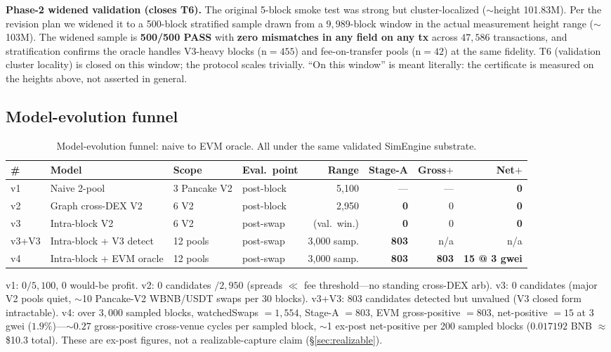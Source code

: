 \documentclass[11pt]{article}
\begin{document}
\noindent \textbf{Phase-2 widened validation (closes T6).} The original 5-block smoke
test was strong but cluster-localized ($\sim$height 101.83M). Per the revision plan we
widened it to a 500-block stratified sample drawn from a $9{,}989$-block window in the
actual measurement height range ($\sim$103M). The widened sample is \textbf{500/500
PASS} with \textbf{zero mismatches in any field on any tx} across $47{,}586$
transactions, and stratification confirms the oracle handles V3-heavy blocks
(n$=455$) and fee-on-transfer pools (n$=42$) at the same fidelity. T6 (validation
cluster locality) is closed on this window; the protocol scales trivially. ``On this
window'' is meant literally: the certificate is measured on the heights above, not
asserted in general.

\subsection{Model-evolution funnel}
\label{sec:backrun-results}
\begin{table}[h]\centering
\caption{Model-evolution funnel: naive to EVM oracle. All under the same validated
SimEngine substrate.}\label{tab:funnel}
\small
\begin{tabular}{llllrrrr}
\toprule
\# & Model & Scope & Eval.\ point & Range & Stage-A & Gross$+$ & Net$+$ \\
\midrule
v1 & Naive 2-pool & 3 Pancake V2 & post-block & 5{,}100 & --- & --- & \textbf{0} \\
v2 & Graph cross-DEX V2 & 6 V2 & post-block & 2{,}950 & \textbf{0} & 0 & \textbf{0} \\
v3 & Intra-block V2 & 6 V2 & post-swap & (val.\ win.) & \textbf{0} & 0 & \textbf{0} \\
v3+V3 & Intra-block + V3 detect & 12 pools & post-swap & 3{,}000 samp. & \textbf{803} & n/a & n/a \\
v4 & Intra-block + EVM oracle & 12 pools & post-swap & 3{,}000 samp. & \textbf{803} & \textbf{803} & \textbf{15 @ 3 gwei} \\
\bottomrule
\end{tabular}
\end{table}

\noindent v1: $0/5{,}100$, $0$ would-be profit. v2: $0$ candidates $/2{,}950$
(spreads $\ll$ fee threshold---no standing cross-DEX arb). v3: $0$ candidates (major
V2 pools quiet, $\sim$10 Pancake-V2 WBNB/USDT swaps per 30 blocks). v3+V3: $803$
candidates detected but unvalued (V3 closed form intractable). v4: over $3{,}000$
sampled blocks, watchedSwaps $=1{,}554$, Stage-A $=803$, EVM gross-positive
$=803$, net-positive $=15$ at 3 gwei ($1.9\%$)---$\sim$$0.27$ gross-positive
cross-venue cycles per sampled block, $\sim$1 ex-post net-positive per 200 sampled
blocks ($0.017192$ BNB $\approx$ \$10.3 total). These are ex-post figures, not a
realizable-capture claim (\S\ref{sec:realizable}).
\end{document}
